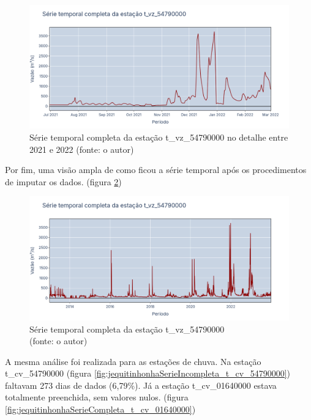 \begin{figure}[!h]
	\centering
	\includegraphics[scale=0.25]{Figuras/jequiti/jequitinhonhaSerieCompleta_t_vz_54790000-2021_2022.png}
	\caption{Série temporal completa da estação t\_vz\_54790000 no detalhe entre 2021 e 2022 (fonte: o autor)}
	\label{fig:jequitinhonhaSerieCompleta_t_vz_54790000-2021_2022}
\end{figure}

Por fim, uma visão ampla de como ficou a série temporal após os procedimentos de imputar os dados. (figura \ref{fig:jequitinhonhaSerieCompleta_t_vz_54790000})

\begin{figure}[!h]
	\centering
	\includegraphics[scale=0.25]{Figuras/jequiti/jequitinhonhaSerieCompleta_t_vz_54790000.png}
	\caption{Série temporal completa da estação t\_vz\_54790000\\(fonte: o autor)}
	\label{fig:jequitinhonhaSerieCompleta_t_vz_54790000}
\end{figure}

A mesma análise foi realizada para as estações de chuva. Na estação t\_cv\_54790000 (figura \ref{fig:jequitinhonhaSerieIncompleta_t_cv_54790000}) faltavam 273 dias de dados (6,79\%). Já a estação t\_cv\_01640000 estava totalmente preenchida, sem valores nulos. (figura \ref{fig:jequitinhonhaSerieCompleta_t_cv_01640000})

